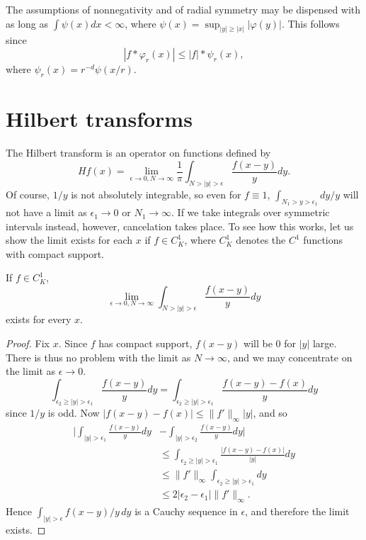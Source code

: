 The assumptions of nonnegativity and of radial symmetry may be dispensed with as long as $\int \psi(x)dx < \infty$, where $\psi(x) = \sup_{|y|\geq|x|} |\varphi(y)|$. This follows since
\[
    |f * \varphi_r(x)| \leq |f| * \psi_r(x),
\]
where $\psi_r(x) = r^{-d}\psi(x/r)$.

\section{Hilbert transforms}\label{ch4_sec2}


The Hilbert transform is an operator on functions defined by
\begin{equation}\label{eq:ch4_2.1}
    Hf(x) = \lim_{\epsilon\to 0,N\to\infty} \frac{1}{\pi} \int_{N>|y|>\epsilon} \frac{f(x-y)}{y}dy.
\end{equation}
Of course, $1/y$ is not absolutely integrable, so even for $f \equiv 1$, $\int_{N_1>y>\epsilon_1} dy/y$ will not have a limit as $\epsilon_1 \to 0$ or $N_1 \to \infty$. If we take integrals over symmetric intervals instead, however, cancelation takes place. To see how this works, let us show the limit exists for each $x$ if $f \in C_K^1$, where $C_K^1$ denotes the $C^1$ functions with compact support.

\begin{proposition}\label{prop:ch4_2.1}
If $f \in C_K^1$,
\[
    \lim_{\epsilon\to 0,N\to\infty} \int_{N>|y|>\epsilon} \frac{f(x-y)}{y}dy
\]
exists for every $x$.
\end{proposition}

\begin{proof}
Fix $x$. Since $f$ has compact support, $f(x-y)$ will be $0$ for $|y|$ large. There is thus no problem with the limit as $N \to \infty$, and we may concentrate on the limit as $\epsilon \to 0$.
\[
    \int_{\epsilon_2\geq|y|>\epsilon_1} \frac{f(x-y)}{y}dy = \int_{\epsilon_2\geq|y|>\epsilon_1} \frac{f(x-y)-f(x)}{y}dy
\]
since $1/y$ is odd. Now $|f(x-y)-f(x)| \leq \|f'\|_\infty|y|$, and so
\mpagebreak
\begin{align*}
    \Big|\int_{|y|>\epsilon_1}\frac{f(x-y)}{y}dy &- \int_{|y|>\epsilon_2}\frac{f(x-y)}{y}dy\Big| \\
    & \leq \int_{\epsilon_2\geq|y|>\epsilon_1} \frac{|f(x-y)-f(x)|}{|y|}dy \\
    &\leq \|f'\|_\infty \int_{\epsilon_2\geq|y|>\epsilon_1} dy \\
    &\leq 2|\epsilon_2-\epsilon_1| \|f'\|_\infty.
\end{align*}
Hence $\int_{|y|>\epsilon} f(x-y)/y\, dy$ is a Cauchy sequence in $\epsilon$, and therefore the limit exists.
\end{proof}

